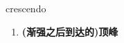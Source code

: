 
\begin{frame}
{\huge crescendo}
\begin{center}
\begin{enumerate}\Large
  \item \textbf{(渐强之后到达的)顶峰}
\end{enumerate}
\end{center}
\end{frame}
